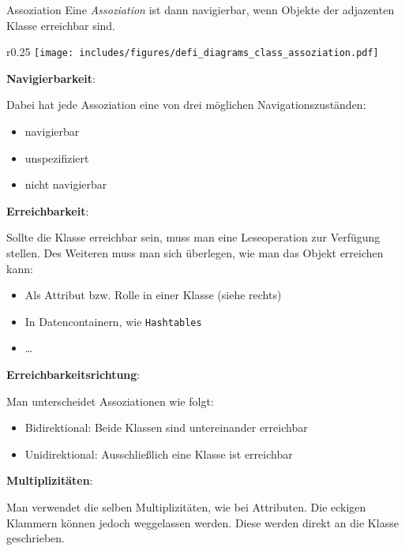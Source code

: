 \begin{diag}{Assoziation}
    Eine \emph{Assoziation} ist dann navigierbar, wenn Objekte der adjazenten Klasse erreichbar sind.

    \begin{wrapfigure}{r}{0.25\textwidth}
        \centering
        \texttt{[image: includes/figures/defi\_diagrams\_class\_assoziation.pdf]}
    \end{wrapfigure}
    \textbf{Navigierbarkeit}:

    Dabei hat jede Assoziation eine von drei möglichen Navigationszuständen:
    \begin{itemize}
        \item navigierbar
        \item unspezifiziert
        \item nicht navigierbar
    \end{itemize}

    \textbf{Erreichbarkeit}:

    Sollte die Klasse erreichbar sein, muss man eine Leseoperation zur Verfügung stellen.
    Des Weiteren muss man sich überlegen, wie man das Objekt erreichen kann:
    \begin{itemize}
        \item Als Attribut bzw. Rolle in einer Klasse (siehe rechts)
        \item In Datencontainern, wie \texttt{Hashtables}
        \item \ldots
    \end{itemize}

    \textbf{Erreichbarkeitsrichtung}:

    Man unterscheidet Assoziationen wie folgt:
    \begin{itemize}
        \item Bidirektional: Beide Klassen sind untereinander erreichbar
        \item Unidirektional: Ausschließlich eine Klasse ist erreichbar
    \end{itemize}

    \textbf{Multiplizitäten}:

    Man verwendet die selben Multiplizitäten, wie bei Attributen.
    Die eckigen Klammern können jedoch weggelassen werden.
    Diese werden direkt an die Klasse geschrieben.
\end{diag}

